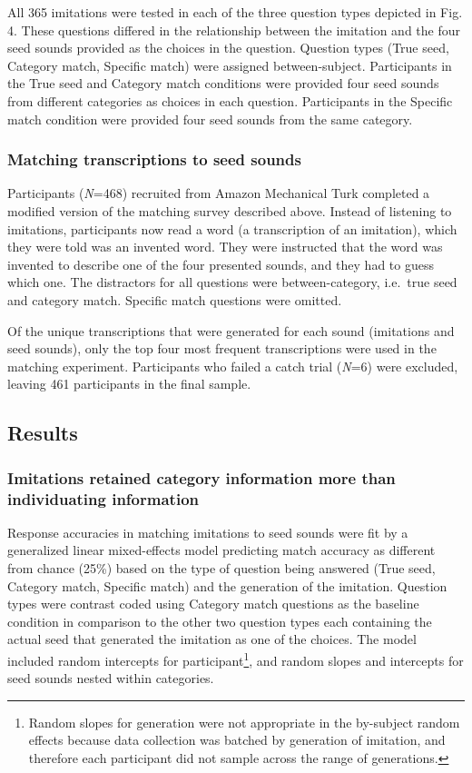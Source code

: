 \documentclass[english,floatsintext,man]{apa6}
\theoremstyle{definition}
\theoremstyle{definition}
\theoremstyle{remark}
\begin{document}
All 365 imitations were tested in each of the three question types
depicted in Fig. 4. These questions differed in the relationship between
the imitation and the four seed sounds provided as the choices in the
question. Question types (True seed, Category match, Specific match)
were assigned between-subject. Participants in the True seed and
Category match conditions were provided four seed sounds from different
categories as choices in each question. Participants in the Specific
match condition were provided four seed sounds from the same category.

\subsubsection{Matching transcriptions to seed
sounds}\label{matching-transcriptions-to-seed-sounds}

Participants (\emph{N}=468) recruited from Amazon Mechanical Turk
completed a modified version of the matching survey described above.
Instead of listening to imitations, participants now read a word (a
transcription of an imitation), which they were told was an invented
word. They were instructed that the word was invented to describe one of
the four presented sounds, and they had to guess which one. The
distractors for all questions were between-category, i.e.~true seed and
category match. Specific match questions were omitted.

Of the unique transcriptions that were generated for each sound
(imitations and seed sounds), only the top four most frequent
transcriptions were used in the matching experiment. Participants who
failed a catch trial (\emph{N}=6) were excluded, leaving 461
participants in the final sample.

\subsection{Results}\label{results-1}

\subsubsection{Imitations retained category information more than
individuating
information}\label{imitations-retained-category-information-more-than-individuating-information}

Response accuracies in matching imitations to seed sounds were fit by a
generalized linear mixed-effects model predicting match accuracy as
different from chance (25\%) based on the type of question being
answered (True seed, Category match, Specific match) and the generation
of the imitation. Question types were contrast coded using Category
match questions as the baseline condition in comparison to the other two
question types each containing the actual seed that generated the
imitation as one of the choices. The model included random intercepts
for participant\footnote{Random slopes for generation were not
  appropriate in the by-subject random effects because data collection
  was batched by generation of imitation, and therefore each participant
  did not sample across the range of generations.}, and random slopes
and intercepts for seed sounds nested within categories.
\end{document}
